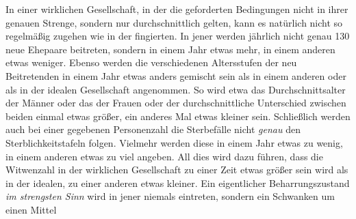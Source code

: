 In einer wirklichen Gesellschaft, in der die geforderten Bedingungen nicht in ihrer genauen Strenge, sondern nur durchschnittlich gelten, kann es natürlich nicht so regelmäßig zugehen wie in der fingierten. In jener werden jährlich nicht genau 130 neue Ehepaare beitreten, sondern in einem Jahr etwas mehr, in einem anderen etwas weniger. Ebenso werden die verschiedenen Altersstufen der neu Beitretenden in einem Jahr etwas anders gemischt sein als in einem anderen oder als in der idealen Gesellschaft angenommen. So wird etwa das Durchschnittsalter der Männer oder das der Frauen oder der durchschnittliche Unterschied zwischen beiden einmal etwas größer, ein anderes Mal etwas kleiner sein. Schließlich werden auch bei einer gegebenen Personenzahl die Sterbefälle nicht \textit{genau} den Sterblichkeitstafeln folgen. Vielmehr werden diese in einem Jahr etwas zu wenig, in einem anderen etwas zu viel angeben. All dies wird dazu führen, dass die Witwenzahl in der wirklichen Gesellschaft zu einer Zeit etwas größer sein wird als in der idealen, zu einer anderen etwas kleiner. Ein eigentlicher Beharrungszustand \textit{im strengsten Sinn} wird in jener niemals eintreten, sondern ein Schwanken um einen Mittel%
%
